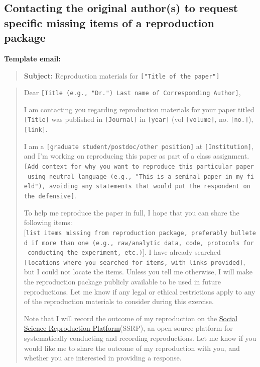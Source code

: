 \documentclass[
  openany]{book}
\begin{document}
\hypertarget{contacting-the-original-authors-to-request-specific-missing-items-of-a-reproduction-package}{%
\subsection{Contacting the original author(s) to request specific missing items of a reproduction package}\label{contacting-the-original-authors-to-request-specific-missing-items-of-a-reproduction-package}}

\textbf{Template email:}

\begin{quote}
\textbf{Subject:} Reproduction materials for \texttt{{[}"Title\ of\ the\ paper"{]}}
\end{quote}

\begin{quote}
Dear \texttt{{[}Title\ (e.g.,\ "Dr.")\ Last\ name\ of\ Corresponding\ Author{]}},

I am contacting you regarding reproduction materials for your paper titled \texttt{{[}Title{]}} was published in \texttt{{[}Journal{]}} in \texttt{{[}year{]}} (vol \texttt{{[}volume{]}}, no. \texttt{{[}no.{]}}), \texttt{{[}link{]}}.

I am a \texttt{{[}graduate\ student/postdoc/other\ position{]}} at \texttt{{[}Institution{]}}, and I'm working on reproducing this paper as part of a class assignment. \texttt{{[}Add\ context\ for\ why\ you\ want\ to\ reproduce\ this\ particular\ paper\ using\ neutral\ language\ (e.g.,\ "This\ is\ a\ seminal\ paper\ in\ my\ field"),\ avoiding\ any\ statements\ that\ would\ put\ the\ respondent\ on\ the\ defensive{]}}.

To help me reproduce the paper in full, I hope that you can share the following items: {[}\texttt{list\ items\ missing\ from\ reproduction\ package,\ preferably\ bulleted\ if\ more\ than\ one\ (e.g.,\ raw/analytic\ data,\ code,\ protocols\ for\ conducting\ the\ experiment,\ etc.)}{]}. I have already searched \texttt{{[}locations\ where\ you\ searched\ for\ items,\ with\ links\ provided{]}}, but I could not locate the items. Unless you tell me otherwise, I will make the reproduction package publicly available to be used in future reproductions. Let me know if any legal or ethical restrictions apply to any of the reproduction materials to consider during this exercise.

Note that I will record the outcome of my reproduction on the \href{https://www.socialsciencereproduction.org/}{Social Science Reproduction Platform}(SSRP), an open-source platform for systematically conducting and recording reproductions. Let me know if you would like me to share the outcome of my reproduction with you, and whether you are interested in providing a response.


\end{quote}
\end{document}
